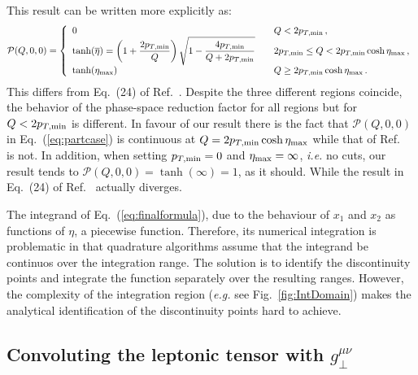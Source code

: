 \documentclass[10pt,a4paper]{article}
\begin{document}
This result can be written more explicitly as:
\begin{equation}\label{eq:partcase}
\mathcal{P}(Q,0,0) = 
\left\{
\begin{array}{ll}
0 & \quad Q< 2p_{T,\rm min}\,,\\
\displaystyle \tanh(\overline{\eta})=\left(1+\frac{2p_{T,\rm min}}{Q}\right)\sqrt{1-\frac{4 p_{T,\rm min}}{Q+2p_{T,\rm min}}}& \quad 2p_{T,\rm min} \leq Q < 2p_{T,\rm min}\cosh\eta_{\rm max}\,,\\
\tanh(\eta_{\rm max}) & \quad Q \geq 2p_{T,\rm min}\cosh\eta_{\rm max}\,.
\end{array}
\right.
\end{equation}
This differs from Eq.~(24) of Ref.~\cite{Scimemi:2017etj}. Despite the
three different regions coincide, the behavior of the phase-space
reduction factor for all regions but for $Q< 2p_{T,\rm min}$ is
different. In favour of our result there is the fact that
$\mathcal{P}(Q,0,0)$ in Eq.~(\ref{eq:partcase}) is continuous at
$Q = 2p_{T,\rm min}\cosh\eta_{\rm max}$ while that of
Ref.~\cite{Scimemi:2017etj} is not. In addition, when setting
$p_{T,\rm min} = 0$ and $\eta_{\rm max}=\infty$, \textit{i.e.} no
cuts, our result tends to $\mathcal{P}(Q,0,0)=\tanh(\infty)=1$, as it
should. While the result in Eq.~(24) of Ref.~\cite{Scimemi:2017etj}
actually diverges.

The integrand of Eq.~(\ref{eq:finalformula}), due to the behaviour of
$x_1$ and $x_2$ as functions of $\eta$, a piecewise
function. Therefore, its numerical integration is problematic in that
quadrature algorithms assume that the integrand be continuos over the
integration range. The solution is to identify the discontinuity
points and integrate the function separately over the resulting
ranges. However, the complexity of the integration region
(\textit{e.g.} see Fig.~\ref{fig:IntDomain}) makes the analytical
identification of the discontinuity points hard to achieve.

\subsection{Convoluting the leptonic tensor with $g_\perp^{\mu\nu}$}
\end{document}

